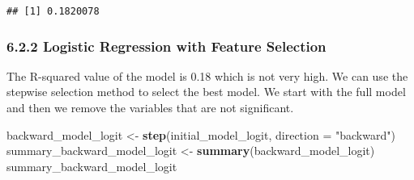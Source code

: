 \documentclass[
]{article}
\newenvironment{Shaded}{\begin{snugshade}}{\end{snugshade}}
\newcommand{\AttributeTok}[1]{\textcolor[rgb]{0.13,0.29,0.53}{#1}}
\newcommand{\DecValTok}[1]{\textcolor[rgb]{0.00,0.00,0.81}{#1}}
\newcommand{\FunctionTok}[1]{\textcolor[rgb]{0.13,0.29,0.53}{\textbf{#1}}}
\newcommand{\NormalTok}[1]{#1}
\newcommand{\OtherTok}[1]{\textcolor[rgb]{0.56,0.35,0.01}{#1}}
\newcommand{\SpecialCharTok}[1]{\textcolor[rgb]{0.81,0.36,0.00}{\textbf{#1}}}
\newcommand{\StringTok}[1]{\textcolor[rgb]{0.31,0.60,0.02}{#1}}
\begin{document}
\begin{Shaded}
\end{Shaded}

\begin{verbatim}
## [1] 0.1820078
\end{verbatim}

\hypertarget{logistic-regression-with-feature-selection}{%
\subsubsection{6.2.2 Logistic Regression with Feature
Selection}\label{logistic-regression-with-feature-selection}}

The R-squared value of the model is 0.18 which is not very high. We can
use the stepwise selection method to select the best model. We start
with the full model and then we remove the variables that are not
significant.

\begin{Shaded}
\begin{Highlighting}[]
\NormalTok{backward\_model\_logit }\OtherTok{\textless{}{-}} \FunctionTok{step}\NormalTok{(initial\_model\_logit, }\AttributeTok{direction =} \StringTok{"backward"}\NormalTok{)}
\NormalTok{summary\_backward\_model\_logit }\OtherTok{\textless{}{-}} \FunctionTok{summary}\NormalTok{(backward\_model\_logit)}
\NormalTok{summary\_backward\_model\_logit}
\end{Highlighting}
\end{Shaded}

\begin{Shaded}
\end{Shaded}
\end{document}
